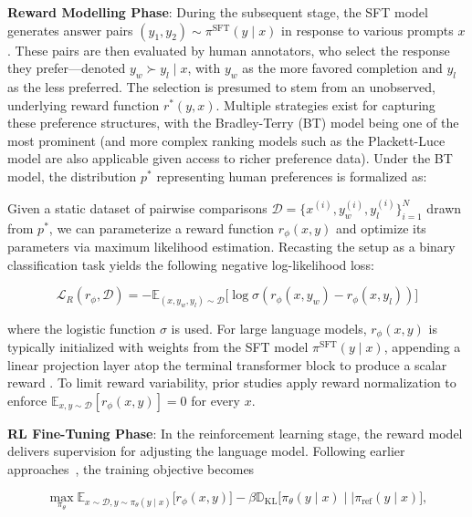 \textbf{Reward Modelling Phase}: During the subsequent stage, the SFT model generates answer pairs $(y_1, y_2)\sim \pi^\text{SFT}(y \mid x)$ in response to various prompts $x$. These pairs are then evaluated by human annotators, who select the response they prefer—denoted $y_w\succ y_l \mid x$, with $y_w$ as the more favored completion and $y_l$ as the less preferred. The selection is presumed to stem from an unobserved, underlying reward function $r^*(y, x)$. Multiple strategies exist for capturing these preference structures, with the Bradley-Terry (BT) \cite{bradley1952rankanalysis} model being one of the most prominent (and more complex ranking models such as the Plackett-Luce model \citep{plackett1975analysis, luce2012individual} are also applicable given access to richer preference data). Under the BT model, the distribution $p^*$ representing human preferences is formalized as:

Given a static dataset of pairwise comparisons $\mathcal{D}=\bigl\{x^{(i)}, y_w^{(i)}, y_l^{(i)}\bigr\}_{i=1}^N$ drawn from $p^*$, we can parameterize a reward function $r_{\phi}(x, y)$ and optimize its parameters via maximum likelihood estimation. Recasting the setup as a binary classification task yields the following negative log-likelihood loss:

\begin{equation}\label{eq:reward_model}
    \mathcal{L}_R(r_{\phi}, \mathcal{D}) = -\mathbb{E}_{(x, y_w, y_l)\sim \mathcal{D}}\bigl[\log \sigma(r_{\phi}(x, y_w)- r_{\phi}(x, y_l))\bigr]
\end{equation}

where the logistic function $\sigma$ is used. For large language models, $r_{\phi}(x, y)$ is typically initialized with weights from the SFT model $\pi^\text{SFT}(y \mid x)$, appending a linear projection layer atop the terminal transformer block to produce a scalar reward \cite{ziegler2020finetuning}. To limit reward variability, prior studies apply reward normalization to enforce $\mathbb{E}_{x,y\sim \mathcal{D}}\left[r_\phi(x, y)\right] = 0$ for every $x$.

\textbf{RL Fine-Tuning Phase}: In the reinforcement learning stage, the reward model delivers supervision for adjusting the language model. Following earlier approaches~\citep{jaques2017sequence, jaques2020human}, the training objective becomes

\begin{equation}\label{eq:RL}
\max_{\pi_{\theta}}  \mathbb{E}_{x\sim \mathcal{D}, y\sim \pi_{\theta}(y \mid x)}\bigl[r_{\phi}(x, y)\bigr] - \beta\mathbb{D}_{\textrm{KL}}\bigl[\pi_{\theta}(y\mid x)\mid \mid \pi_\text{ref}(y\mid x)\bigr],
\end{equation}

